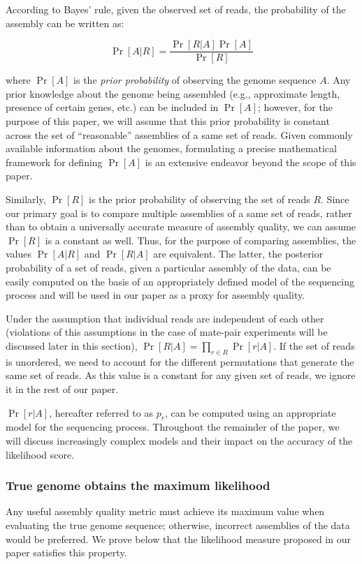 \documentclass[12pt,\mydriver]{thesis}
\begin{document}
According to Bayes' rule, given the observed set of reads, the probability of the assembly can be written as:

\begin{equation}
  \Pr[A \vert R] = \frac{\Pr[R \vert A] \Pr[A]}{\Pr[R]}
\end{equation}

\noindent where $\Pr[A]$ is the \emph{prior probability} of observing the genome
sequence $A$. Any prior knowledge about the genome being assembled
(e.g., approximate length, presence of certain genes, etc.) can be
included in $\Pr[A]$; however, for the purpose of this paper, we will
assume that this prior probability is constant across the set of
``reasonable'' assemblies of a same set of reads.
Given commonly available information about the genomes, formulating a precise mathematical framework for defining $\Pr[A]$ is an extensive endeavor beyond the scope of this paper.

Similarly, $\Pr[R]$ is the prior probability of observing the set of
reads $R$.  Since our primary goal is to compare multiple assemblies
of a same set of reads, rather than to obtain a universally accurate
measure of assembly quality, we can assume $\Pr[R]$ is a constant as
well.  Thus, for the purpose of comparing assemblies, the values $\Pr[A
  \vert R]$ and $\Pr[R \vert A]$ are equivalent.  The latter, the
posterior probability of a set of reads, given a particular assembly of
the data, can be easily computed on the basis of an appropriately
defined model of the sequencing process and will be used in our paper
as a proxy for assembly quality.

Under the assumption that individual reads are independent of each
other (violations of this assumptions in the case of mate-pair
experiments will be discussed later in this section), $\Pr[R \vert A]
= \prod_{r \in R} \Pr[r \vert A]$. If the set of reads is unordered, we need to account for the different permutations that generate the same set of reads.  As this value is a constant for any given set of reads, we ignore it in the rest of our paper.

$\Pr[r \vert A]$, hereafter referred to as $p_r$, can be computed using an appropriate
model for the sequencing process.  Throughout the remainder of the
paper, we will discuss increasingly complex models and their impact on
the accuracy of the likelihood score.

\subsubsection{True genome obtains the maximum likelihood}
\label{maximizing_likelihood}
Any useful assembly quality metric must achieve its maximum value when
evaluating the true genome sequence; otherwise, incorrect assemblies of
the data would be preferred.  We prove below that the likelihood
measure proposed in our paper satisfies this property.
\end{document}

